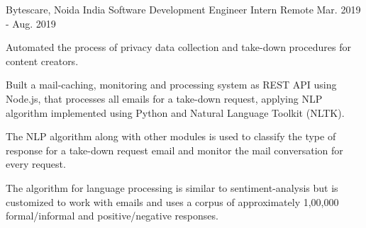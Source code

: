 \begin{cventries}
  \cventry
    {Bytescare, Noida India} %
    {Software Development Engineer Intern} %
    {Remote} %
    {Mar. 2019 - Aug. 2019} %
    {
      \begin{cvitems} %
        \item {Automated the process of privacy data collection and take-down procedures for content creators.}
        \item {Built a mail-caching, monitoring and processing system as REST API using Node.js, that processes all emails for a take-down request, applying NLP algorithm implemented using Python and Natural Language Toolkit (NLTK).}
        \item {The NLP algorithm along with other modules is used to classify the type of response for a take-down request email and monitor the mail conversation for every request.}
        \item {The algorithm for language processing is similar to sentiment-analysis but is customized to work with emails and uses a corpus of approximately 1,00,000 formal/informal and positive/negative responses.}
      \end{cvitems}
    }
\end{cventries}
